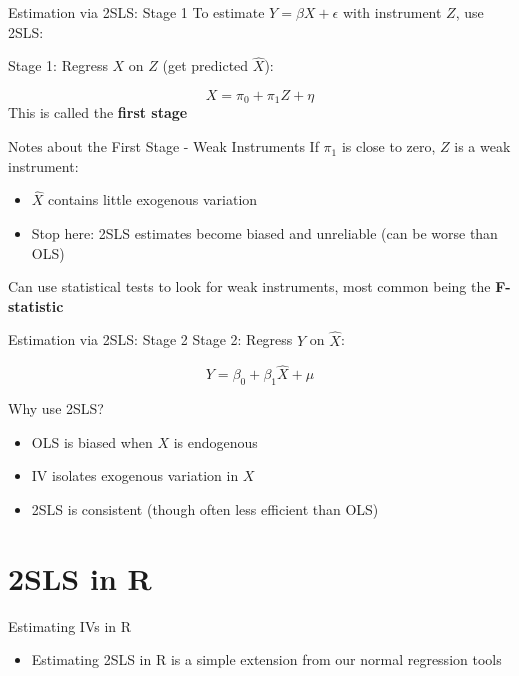 \documentclass[
  ignorenonframetext,
]{beamer}
\providecommand{\tightlist}{%
  \setlength{\itemsep}{0pt}\setlength{\parskip}{0pt}}
\begin{document}
\begin{frame}{Estimation via 2SLS: Stage 1}
\label{estimation-via-2sls-stage-1}
To estimate \(Y = \beta X + \epsilon\) with instrument \(Z\), use 2SLS:

Stage 1: Regress \(X\) on \(Z\) (get predicted \(\hat{X}\)):

\[ X = \pi_0 + \pi_{1}Z + \eta \] This is called the \textbf{first
stage}
\end{frame}

\begin{frame}{Notes about the First Stage - Weak Instruments}
\label{notes-about-the-first-stage---weak-instruments}
If \(\pi_1\) is close to zero, \(Z\) is a weak instrument:

\begin{itemize}
\tightlist
\item
  \(\hat{X}\) contains little exogenous variation
\item
  Stop here: 2SLS estimates become biased and unreliable (can be worse
  than OLS)
\end{itemize}

Can use statistical tests to look for weak instruments, most common
being the \textbf{F-statistic}
\end{frame}

\begin{frame}{Estimation via 2SLS: Stage 2}
\label{estimation-via-2sls-stage-2}
Stage 2: Regress \(Y\) on \(\hat{X}\):

\[ Y = \beta_0 + \beta_1 \hat{X} + \mu \]
\end{frame}

\begin{frame}{Why use 2SLS?}
\label{why-use-2sls}
\begin{itemize}
\tightlist
\item
  OLS is biased when \(X\) is endogenous
\item
  IV isolates exogenous variation in \(X\)
\item
  2SLS is consistent (though often less efficient than OLS)
\end{itemize}
\end{frame}

\section{2SLS in R}\label{sls-in-r}

\begin{frame}{Estimating IVs in R}
\label{estimating-ivs-in-r}
\begin{itemize}
\tightlist
\item
  Estimating 2SLS in R is a simple extension from our normal regression
  tools
\end{itemize}
\end{frame}
\end{document}
